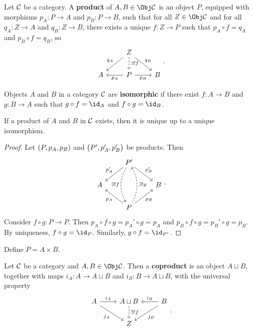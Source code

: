 
\begin{definition*}
Let $ \mathcal{C} $ be a category. A \textbf{product} of $ A, B \in \Obj \CCC $ is an object $ P $, equipped with morphisms $ p_A : P \to A $ and $ p_B : P \to B $, such that for all $ Z \in \Obj \CCC $ and for all $ q_A : Z \to A $ and $ q_B : Z \to B $, there exists a unique $ f : Z \to P $ such that $ p_A \circ f = q_A $ and $ p_B \circ f = q_B $, so
$$
\begin{tikzcd}
& Z \arrow{dl}[swap]{q_A} \arrow[dashed]{d}{\exists !f} \arrow{dr}{q_B} & \\
A & P \arrow{l}{p_A} \arrow{r}[swap]{p_B} & B
\end{tikzcd}.
$$
\end{definition*}

\begin{definition*}
Objects $ A $ and $ B $ in a category $ \mathcal{C} $ are \textbf{isomorphic} if there exist $ f : A \to B $ and $ g : B \to A $ such that $ g \circ f = \id_A $ and $ f \circ g = \id_B $.
\end{definition*}

\begin{proposition}
If a product of $ A $ and $ B $ in $ \mathcal{C} $ exists, then it is unique up to a unique isomorphism.
\end{proposition}

\begin{proof}
Let $ \br{P, p_A, p_B} $ and $ \br{P', p_A', p_B'} $ be products. Then
$$
\begin{tikzcd}
& P' \arrow{dl}[swap]{p_A'} \arrow[bend right=30, dashed]{dd}[swap]{\exists !f} \arrow{dr}{p_B'} & \\
A & & B \\
& P \arrow{ul}{p_A} \arrow[bend right=30, dashed]{uu}[swap]{\exists !g} \arrow{ur}[swap]{p_B} &
\end{tikzcd}.
$$
Consider $ f \circ g : P \to P $. Then $ p_A \circ f \circ g = p_A' \circ g = p_A $ and $ p_B \circ f \circ g = p_B' \circ g = p_B $. By uniqueness, $ f \circ g = \id_P $. Similarly, $ g \circ f = \id_{P'} $.
\end{proof}

\begin{notation*}
Define $ P = A \times B $.
\end{notation*}

\begin{definition*}
Let $ \mathcal{C} $ be a category and $ A, B \in \Obj \CCC $. Then a \textbf{coproduct} is an object $ A \sqcup B $, together with maps $ i_A : A \to A \sqcup B $ and $ i_B : B \to A \sqcup B $, with the universal property
$$
\begin{tikzcd}
A \arrow{r}{i_A} \arrow{dr}[swap]{j_A} & A \sqcup B \arrow[dashed]{d}{\exists !f} & B \arrow{l}[swap]{i_B} \arrow{dl}{j_B} \\
& Z &
\end{tikzcd}.
$$
\end{definition*}

